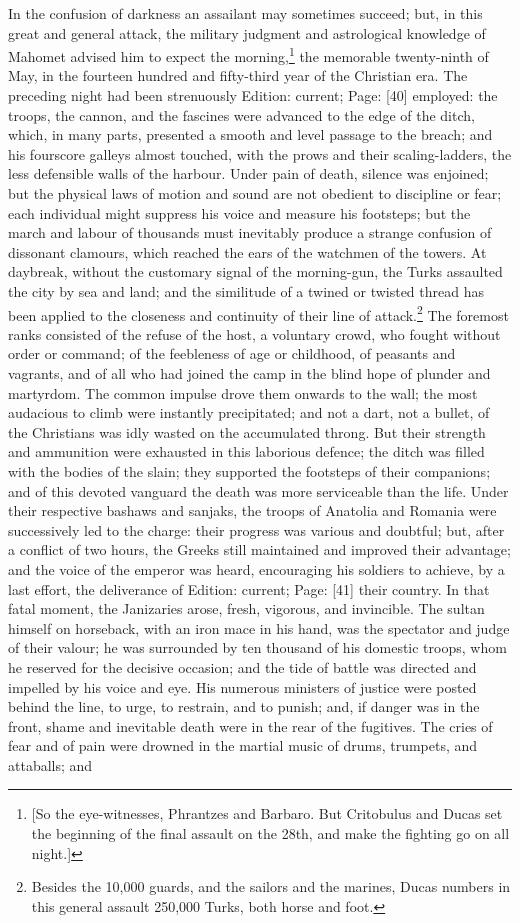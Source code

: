 In the confusion of darkness an assailant may sometimes succeed; but, in this great and general attack, the military judgment and astrological knowledge of Mahomet advised him to expect the morning,\footnote{[So the eye-witnesses, Phrantzes and Barbaro. But Critobulus and Ducas set the beginning of the final assault on the 28th, and make the fighting go on all night.]} the memorable twenty-ninth of May, in the fourteen hundred and fifty-third year of the Christian era. The preceding night had been strenuously Edition: current; Page: [40] employed: the troops, the cannon, and the fascines were advanced to the edge of the ditch, which, in many parts, presented a smooth and level passage to the breach; and his fourscore galleys almost touched, with the prows and their scaling-ladders, the less defensible walls of the harbour. Under pain of death, silence was enjoined; but the physical laws of motion and sound are not obedient to discipline or fear; each individual might suppress his voice and measure his footsteps; but the march and labour of thousands must inevitably produce a strange confusion of dissonant clamours, which reached the ears of the watchmen of the towers. At daybreak, without the customary signal of the morning-gun, the Turks assaulted the city by sea and land; and the similitude of a twined or twisted thread has been applied to the closeness and continuity of their line of attack.\footnote{Besides the 10,000 guards, and the sailors and the marines, Ducas numbers in this general assault 250,000 Turks, both horse and foot.} The foremost ranks consisted of the refuse of the host, a voluntary crowd, who fought without order or command; of the feebleness of age or childhood, of peasants and vagrants, and of all who had joined the camp in the blind hope of plunder and martyrdom. The common impulse drove them onwards to the wall; the most audacious to climb were instantly precipitated; and not a dart, not a bullet, of the Christians was idly wasted on the accumulated throng. But their strength and ammunition were exhausted in this laborious defence; the ditch was filled with the bodies of the slain; they supported the footsteps of their companions; and of this devoted vanguard the death was more serviceable than the life. Under their respective bashaws and sanjaks, the troops of Anatolia and Romania were successively led to the charge: their progress was various and doubtful; but, after a conflict of two hours, the Greeks still maintained and improved their advantage; and the voice of the emperor was heard, encouraging his soldiers to achieve, by a last effort, the deliverance of Edition: current; Page: [41] their country. In that fatal moment, the Janizaries arose, fresh, vigorous, and invincible. The sultan himself on horseback, with an iron mace in his hand, was the spectator and judge of their valour; he was surrounded by ten thousand of his domestic troops, whom he reserved for the decisive occasion; and the tide of battle was directed and impelled by his voice and eye. His numerous ministers of justice were posted behind the line, to urge, to restrain, and to punish; and, if danger was in the front, shame and inevitable death were in the rear of the fugitives. The cries of fear and of pain were drowned in the martial music of drums, trumpets, and attaballs; and 